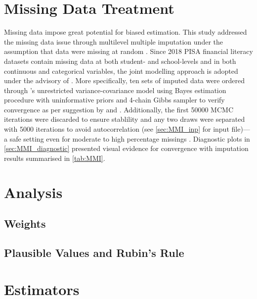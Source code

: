 \documentclass[a4paper,11pt,UKenglish,twoside,openright]{report}\usepackage[]{graphicx}\usepackage[]{color}
\begin{document}
\section{Missing Data Treatment}

Missing data impose great potential for biased estimation. This study addressed the missing data issue through multilevel multiple imputation under the assumption that data were missing at random \parencite{little:2019}. Since 2018 PISA financial literacy datasets contain missing data at both student- and school-levels and in both continuous and categorical variables, the joint modelling approach is adopted under the advisory of \textcite{grund:2018}. More specifically, ten sets of imputed data were ordered through 's unrestricted variance-covariance model \parencite[``JM-AM H1'',][]{asparouhov:2010} using Bayes estimation procedure with uninformative priors and 4-chain Gibbs sampler to verify convergence as per suggestion by \textcite[][p. 230]{little:2019} and \textcite[][p. 314]{lambert:2018}. Additionally, the first 50000 MCMC iterations were discarded to ensure stablility and any two draws were separated with 5000 iterations to avoid autocorrelation (see \cref{sec:MMI_inp} for input file)---a safe setting even for moderate to high percentage missings \parencite{grund:2016}. Diagnostic plots in \cref{sec:MMI_diagnostic} presented visual evidence for convergence with imputation results summarised in \cref{tab:MMI}.

\section{Analysis}

\subsection{Weights}

\subsection{Plausible Values and Rubin's Rule}

\section{Estimators}
\end{document}
